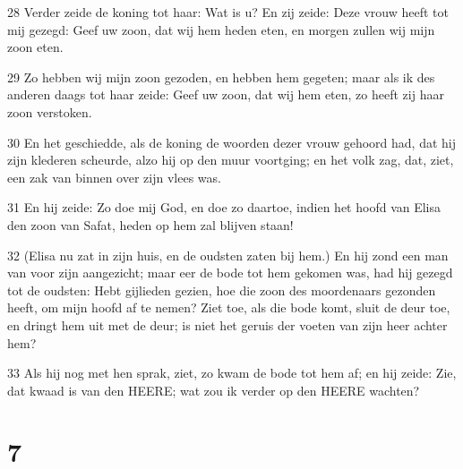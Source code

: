 \par 28 Verder zeide de koning tot haar: Wat is u? En zij zeide: Deze vrouw heeft tot mij gezegd: Geef uw zoon, dat wij hem heden eten, en morgen zullen wij mijn zoon eten.
\par 29 Zo hebben wij mijn zoon gezoden, en hebben hem gegeten; maar als ik des anderen daags tot haar zeide: Geef uw zoon, dat wij hem eten, zo heeft zij haar zoon verstoken.
\par 30 En het geschiedde, als de koning de woorden dezer vrouw gehoord had, dat hij zijn klederen scheurde, alzo hij op den muur voortging; en het volk zag, dat, ziet, een zak van binnen over zijn vlees was.
\par 31 En hij zeide: Zo doe mij God, en doe zo daartoe, indien het hoofd van Elisa den zoon van Safat, heden op hem zal blijven staan!
\par 32 (Elisa nu zat in zijn huis, en de oudsten zaten bij hem.) En hij zond een man van voor zijn aangezicht; maar eer de bode tot hem gekomen was, had hij gezegd tot de oudsten: Hebt gijlieden gezien, hoe die zoon des moordenaars gezonden heeft, om mijn hoofd af te nemen? Ziet toe, als die bode komt, sluit de deur toe, en dringt hem uit met de deur; is niet het geruis der voeten van zijn heer achter hem?
\par 33 Als hij nog met hen sprak, ziet, zo kwam de bode tot hem af; en hij zeide: Zie, dat kwaad is van den HEERE; wat zou ik verder op den HEERE wachten?

\chapter{7}

